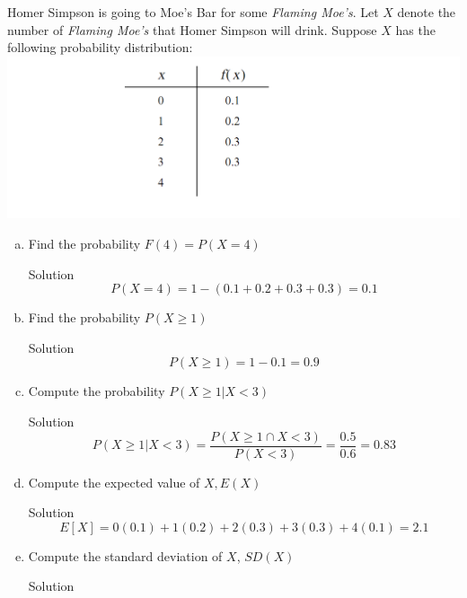 \documentclass{article}
\begin{document}
\begin{spacing}{1.1}
\maketitle
\newpage
\begin{homeworkProblem}
		Homer Simpson is going to Moe's Bar for some \emph{Flaming Moe's}.  Let $X$ denote the number of \emph{Flaming Moe's} that Homer Simpson will drink.  Suppose $X$ has the following probability distribution: 
	\\ \includegraphics[width=\linewidth]{prob1.png}		
	\begin{enumerate}[(a)]
		\item Find the probability $F(4) = P(X = 4)$
			\begin{homeworkSection}{Solution}
				\[P(X = 4) = 1 - \left( {0.1 + 0.2 + 0.3 + 0.3} \right) = 0.1\]
			\end{homeworkSection}
		\item Find the probability $P(X \ge 1)$
			\begin{homeworkSection}{Solution}
				\[P\left( {X \ge 1} \right) = 1 - 0.1 = 0.9\]
			\end{homeworkSection}
		\item Compute the probability $P(X \ge 1 | X < 3)$
			\begin{homeworkSection}{Solution}
				\[P\left( {X \geqslant 1|X < 3} \right) = \frac{{P\left( {X \geqslant 1 \cap X < 3} \right)}}{{P\left( {X < 3} \right)}} = \frac{{0.5}}{{0.6}} = 0.83\]
			\end{homeworkSection}
		\item Compute the expected value of $X, E(X)$
			\begin{homeworkSection}{Solution}
				\[E\left[ X \right] = 0(0.1) + 1(0.2) + 2(0.3) + 3(0.3) + 4(0.1) = 2.1\]
			\end{homeworkSection}
		\item Compute the standard deviation of $X$, $SD(X)$
			\begin{homeworkSection}{Solution}

\end{homeworkSection}
\end{enumerate}
\end{homeworkProblem}
\end{spacing}
\end{document}
